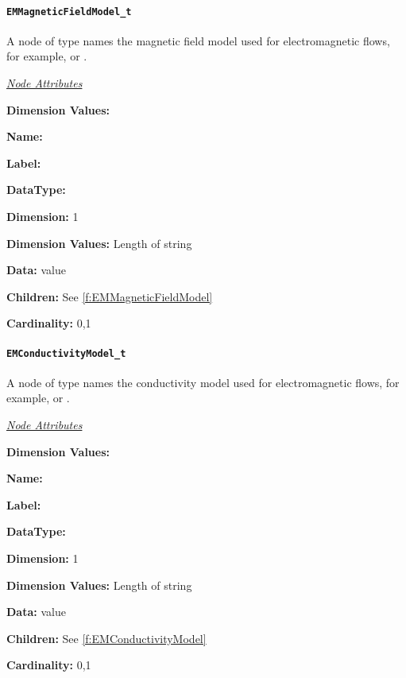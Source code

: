 \paragraph{\texttt{EMMagneticFieldModel\_t}}

A node of type  names the magnetic
field model used for electromagnetic flows, for example,
 or .

\textit{\uline{Node Attributes}}
\begin{Ventryic}{\textbf{Dimension Values:}}
\item [\textbf{Name:}]
\item [\textbf{Label:}]
\item [\textbf{DataType:}]
\item [\textbf{Dimension:}]
      1
\item [\textbf{Dimension Values:}]
      Length of string
\item [\textbf{Data:}]
       value
\item [\textbf{Children:}]
      See \autoref{f:EMMagneticFieldModel}
\item [\textbf{Cardinality:}]
      0,1
\end{Ventryic}

\paragraph{\texttt{EMConductivityModel\_t}}

A node of type  names the conductivity
model used for electromagnetic flows, for example,
 or .

\textit{\uline{Node Attributes}}
\begin{Ventryic}{\textbf{Dimension Values:}}
\item [\textbf{Name:}]
\item [\textbf{Label:}]
\item [\textbf{DataType:}]
\item [\textbf{Dimension:}]
      1
\item [\textbf{Dimension Values:}]
      Length of string
\item [\textbf{Data:}]
       value
\item [\textbf{Children:}]
      See \autoref{f:EMConductivityModel}
\item [\textbf{Cardinality:}]
      0,1
\end{Ventryic}

